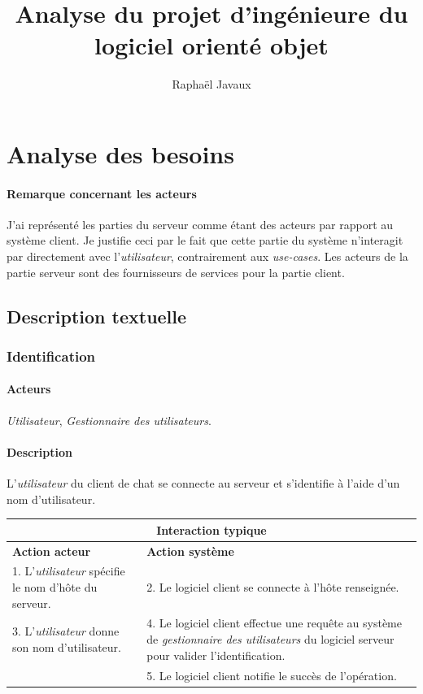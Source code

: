 \documentclass[a4paper]{article}
\title{Analyse du projet d’ingénieure du logiciel orienté objet}
\author{Raphaël Javaux}
\date{}
\begin{document}
\maketitle

 \section{Analyse des besoins}

    \paragraph{Remarque concernant les acteurs} J'ai représenté les parties
du serveur comme étant des acteurs par rapport au système client.
Je justifie ceci par le fait que cette partie du système n’interagit par
directement avec l'\textit{utilisateur}, contrairement aux \textit{use-cases}.
Les acteurs de la partie serveur sont des fournisseurs de services pour la 
partie client.

  \subsection{Description textuelle}

   \subsubsection{Identification}
    \paragraph{Acteurs} \textit{Utilisateur}, 
    \textit{Gestionnaire des utilisateurs}.

    \paragraph{Description} L'\textit{utilisateur} du client de chat se connecte
    au serveur et s'identifie à l'aide d'un nom d'utilisateur.

    \begin{center}
        \begin{tabular}{|p{6cm}|p{6cm}|}
            \hline
            \multicolumn{2}{|c|}{\textbf{Interaction typique}} \\ \hline
            \textbf{Action acteur} & \textbf{Action système} \\ \hline
            1. L'\textit{utilisateur} spécifie le nom d'hôte du serveur. & 
            2. Le logiciel client se connecte à l'hôte renseignée. \\
            3. L'\textit{utilisateur} donne son nom d'utilisateur. &
            4. Le logiciel client effectue une requête au système de
            \textit{gestionnaire des utilisateurs} du logiciel serveur pour
            valider l'identification. \\
            & 5. Le logiciel client notifie le succès de l'opération. \\
            \hline
        \end{tabular}
    \end{center}
\end{document}
